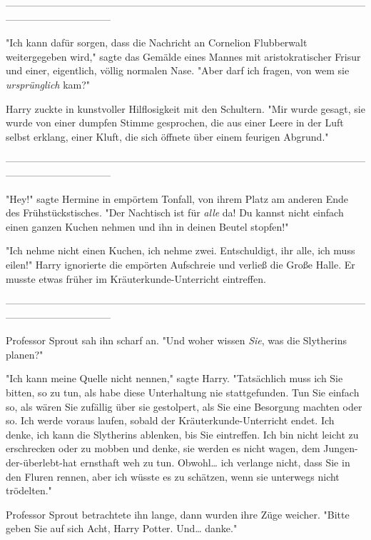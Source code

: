 {--------------------------------------------------------------------------------------------------------------------------------------------

"Ich kann dafür sorgen, dass die Nachricht an Cornelion Flubberwalt weitergegeben wird," sagte das Gemälde eines Mannes mit aristokratischer Frisur und einer, eigentlich, völlig normalen Nase. "Aber darf ich fragen, von wem sie \emph{ursprünglich} kam?"

Harry zuckte in kunstvoller Hilflosigkeit mit den Schultern. "Mir wurde gesagt, sie wurde von einer dumpfen Stimme gesprochen, die aus einer Leere in der Luft selbst erklang, einer Kluft, die sich öffnete über einem feurigen Abgrund."

--------------------------------------------------------------------------------------------------------------------------------------------

"Hey!" sagte Hermine in empörtem Tonfall, von ihrem Platz am anderen Ende des Frühstückstisches. "Der Nachtisch ist für \emph{alle} da! Du kannst nicht einfach einen ganzen Kuchen nehmen und ihn in deinen Beutel stopfen!"

"Ich nehme nicht einen Kuchen, ich nehme zwei. Entschuldigt, ihr alle, ich muss eilen!" Harry ignorierte die empörten Aufschreie und verließ die Große Halle. Er musste etwas früher im Kräuterkunde-Unterricht eintreffen.

--------------------------------------------------------------------------------------------------------------------------------------------

Professor Sprout sah ihn scharf an. "Und woher wissen \emph{Sie}, was die Slytherins planen?"

"Ich kann meine Quelle nicht nennen," sagte Harry. "Tatsächlich muss ich Sie bitten, so zu tun, als habe diese Unterhaltung nie stattgefunden. Tun Sie einfach so, als wären Sie zufällig über sie gestolpert, als Sie eine Besorgung machten oder so. Ich werde voraus laufen, sobald der Kräuterkunde-Unterricht endet. Ich denke, ich kann die Slytherins ablenken, bis Sie eintreffen. Ich bin nicht leicht zu erschrecken oder zu mobben und denke, sie werden es nicht wagen, dem Jungen-der-überlebt-hat ernsthaft weh zu tun. Obwohl… ich verlange nicht, dass Sie in den Fluren rennen, aber ich wüsste es zu schätzen, wenn sie unterwegs nicht trödelten."

Professor Sprout betrachtete ihn lange, dann wurden ihre Züge weicher. "Bitte geben Sie auf sich Acht, Harry Potter. Und… danke."

}
